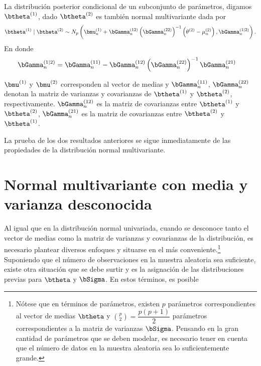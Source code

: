 \begin{Res}
  La distribución posterior condicional de un subconjunto de parámetros, digamos $\btheta^{(1)}$, dado $\btheta^{(2)}$ es también normal multivariante dada por
  \begin{equation*}
  \btheta^{(1)} \mid \btheta^{(2)} \sim N_p \left(\bmu_n^{(1)}+\bGamma_n^{(12)}\left(\bGamma_n^{(22)}\right)^{-1}
  \left(\theta^{(2)}-\mu_n^{(2)}\right),\bGamma_n^{(1 \mid 2)}\right).
  \end{equation*}
  En donde
  \begin{align}
  \bGamma_n^{(1 \mid 2)}&= \bGamma_n^{(11)}-\bGamma_n^{(12)}\left(\bGamma_n^{(22)}\right)^{-1}\bGamma_n^{(21)}
  \end{align}

$\bmu^{(1)}$ y $\bmu^{(2)}$ corresponden al vector de medias y $\bGamma_n^{(11)}$, $\bGamma_n^{(22)}$ denotan la matriz de varianzas y covarianzas de $\btheta^{(1)}$ y $\btheta^{(2)}$, respectivamente. $\bGamma_n^{(12)}$ es la matriz de covarianzas entre $\btheta^{(1)}$ y $\btheta^{(2)}$, $\bGamma_n^{(21)}$ es la matriz de covarianzas entre $\btheta^{(2)}$ y $\btheta^{(1)}$. 
\end{Res}
  
La prueba de los dos resultados anteriores se sigue inmediatamente de las propiedades de la distribución normal multivariante.

\section{Normal multivariante con media y varianza desconocida}
  
Al igual que en la distribución normal univariada, cuando se desconoce tanto el vector de medias como la matriz de varianzas y covarianzas de la distribución, es necesario plantear diversos enfoques y situarse en el más conveniente.\footnote{Nótese que en términos de parámetros, existen $p$ parámetros correspondientes al vector de medias $\btheta$ y $\binom{p}{2}=\dfrac{p(p+1)}{2}$ parámetros correspondientes a la matriz de varianzas $\bSigma$. Pensando en la gran cantidad de parámetros que se deben modelar, es necesario tener en cuenta que el número de datos en la muestra aleatoria sea lo suficientemente grande.} Suponiendo que el número de observaciones en la muestra aleatoria sea suficiente, existe otra situación que se debe surtir y es la asignación de las distribuciones previas para $\btheta$ y $\bSigma$. En estos términos, es posible
  
